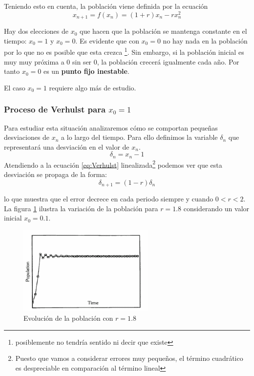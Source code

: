 Teniendo esto en cuenta, la población viene definida por la ecuación
\begin{equation}
x_{n+1} = f(x_n) = (1+r)x_n - rx_n^2
\end{equation}\label{eq:Verhulst}

Hay dos elecciones de $x_0$ que hacen que la población se mantenga constante en el tiempo: $x_0=1$ y $x_0=0$. Es evidente que con $x_0=0$ no hay nada en la población por lo que no es posible que esta crezca \footnote{posiblemente no tendría sentido ni decir que existe}. Sin embargo, si la población inicial es muy muy próxima a 0 sin ser 0, la población crecerá igualmente cada año. Por tanto $x_0=0$ es un \textbf{punto fijo inestable}.

El caso $x_0=1$ requiere algo más de estudio.

\subsubsection{Proceso de Verhulst para $x_0=1$}
Para estudiar esta situación analizaremos cómo se comportan pequeñas desviaciones de $x_n$ a lo largo del tiempo. Para ello definimos la variable $δ_n$ que representará una desviación en el valor de $x_n$.
\[δ_n = x_n-1\]
Atendiendo a la ecuación \ref{eq:Verhulst} linealizada\footnote{Puesto que vamos a considerar errores muy pequeños, el término cuadrático es despreciable en comparación al término lineal} podemos ver que esta desviación se propaga de la forma:
\[δ_{n+1} = (1-r)δ_n\]

lo que muestra que el error decrece en cada periodo siempre y cuando $0<r<2$. La figura \ref{fig:r1_8} ilustra la variación de la población para $r=1.8$ considerando un valor inicial $x_0=0.1$.

\begin{figure}[hbtp]
\centering
\includegraphics[width = 0.6\textwidth]{img/r1_8.png}
\caption{Evolución de la población con $r=1.8$}
\label{fig:r1_8}
\end{figure}

